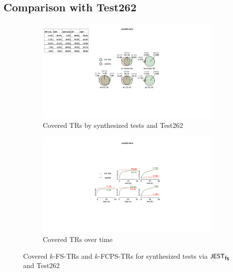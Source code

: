 
\subsection{Comparison with Test262}\label{sec:compare-test262}

\begin{figure}
  \centering
%
  \begin{subfigure}{0.49\textwidth}
    \includegraphics[width=\textwidth]{img/test262-venn}
    \caption{Covered TRs by synthesized tests and Test262}
  \end{subfigure}
%
  \begin{subfigure}{0.49\textwidth}
    \includegraphics[width=\textwidth]{img/test262-time}
    \caption{Covered TRs over time}
  \end{subfigure}
%
  \vspace*{-.5em}
  \caption{Covered $k$-FS-TRs and $k$-FCPS-TRs for synthesized tests via $\textsf{\small JEST}_{\textsf{\small fs}}$
  and Test262}
  \vspace*{-1em}
  \label{fig:test262}
\end{figure}

